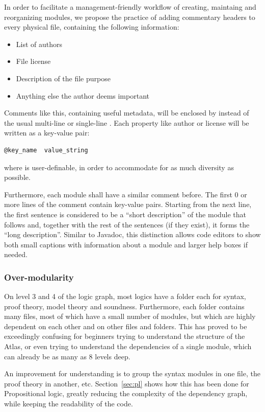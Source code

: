 In order to facilitate a management-friendly workflow of creating, maintaing and reorganizing modules, we propose the practice of adding commentary headers to every physical file, containing the following information:
\begin{itemize}
\item List of authors
\item File license
\item Description of the file purpose
\item Anything else the author deems important
\end{itemize}
Comments like this, containing useful metadata, will be enclosed by  instead of the usual multi-line  or single-line \ttt{\%\%}. Each property like author or license will be written as a key-value pair:
\begin{verbatim}
@key_name  value_string
\end{verbatim}
where  is user-definable, in order to accommodate for as much diversity as possible.

Furthermore, each module shall have a similar comment before. The first 0 or more lines of the comment contain key-value pairs. Starting from the next line, the first sentence is considered to be a ``short description'' of the module that follows and, together with the rest of the sentences (if they exist), it forms the ``long description''. Similar to Javadoc, this distinction allows code editors to show both small captions with information about a module and larger help boxes if needed.

\subsubsection{Over-modularity}

On level 3 and 4 of the logic graph, most logics have a folder each for syntax, proof theory, model theory and soundness. Furthermore, each folder contains many files, most of which have a small number of modules, but which are highly dependent on each other and on other files and folders. This has proved to be exceedingly confusing for beginners trying to understand the structure of the Atlas, or even trying to understand the dependencies of a single module, which can already be as many as 8 levels deep. 

An improvement for understanding is to group the syntax modules in one file, the proof theory in another, etc. Section~\ref{sec:pl} shows how this has been done for Propositional logic, greatly reducing the complexity of the dependency graph, while keeping the readability of the code.

